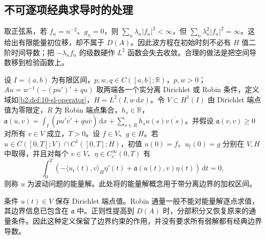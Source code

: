 \subsection{不可逐项经典求导时的处理}
\label{b2:subsec:100402}

取正弦系，若 \(f_n=n^{-2}\)、\(g_n=0\)，则 \(\sum_n\lambda_n|f_n|^2<\infty\)，但 \(\sum_n\lambda_n^2|f_n|^2=\infty\)。这给出有限能量初位移，却不属于 \(D(A)\)。因此波方程在初始时刻不必有 \(H\) 值二阶时间导数；把 \(-\lambda_nf_n\) 的级数硬作 \(L^2\) 函数会失去收敛。合理的做法是把空间导数移到检验函数上。

\begin{definition}\label{b2:def:10-energy-wave}
设 \(I=(a,b)\) 为有限区间，\(p,w,q\in C([a,b];\mathbb R)\)，\(p,w>0\)；\(Au=w^{-1}(-(pu')'+qu)\) 取两端各一个实分离 Dirichlet 或 Robin 条件，定义域如\cref{b2:def:10-sl-operator}，\(H=L^2(I,w\,\mathrm dx)\)。令 \(V\subset H^1(I)\) 由 Dirichlet 端点值为零限定，\(R\) 为 Robin 端点集合，\(h_s\in\mathbb R\)，\(\mathfrak a(u,v)=\int_I(pu'\overline{v'}+qu\overline v)\,\mathrm dx+\sum_{s\in R}h_su(s)\overline{v(s)}\)。并假设 \(\mathfrak a(v,v)\geq0\) 对所有 \(v\in V\) 成立，\(T>0\)。设 \(f\in V\)、\(g\in H\)。若 \(u\in C([0,T];V)\cap C^1([0,T];H)\)，初值 \(u(0)=f\)、\(u_t(0)=g\) 分别在 \(V,H\) 中取得，并且对每个 \(v\in V\)、\(\eta\in C_c^\infty(0,T)\) 有
\[
 \int_0^T\left(-\langle u_t(t),v\rangle_H\eta'(t)
 +\mathfrak a(u(t),v)\eta(t)\right)\,\mathrm{d}t=0,
\]
则称 \(u\) 为波动问题的能量解。此处将的能量解概念用于带分离边界的加权区间。
\end{definition}

条件 \(u(t)\in V\) 保存 Dirichlet 端点值。Robin 通量一般不能对能量解逐点求值，其边界信息已包含在 \(\mathfrak a\) 中。正则性提高到 \(D(A)\) 时，分部积分又恢复原来的通量条件。因此这种定义保留了边界约束的作用，并没有要求所有弱解都有经典边界导数。

